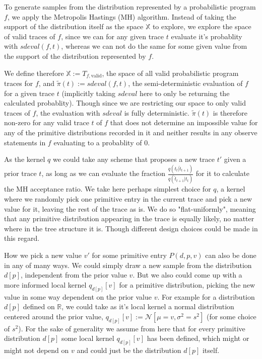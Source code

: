 To generate samples from the distribution represented by a probabilistic program $f$, we apply the Metropolis Hastings (MH) algorithm. Instead of taking the support of the distribution itself as the space $\mathbb{X}$ to explore, we explore the space of valid traces of $f$, since we can for any given trace $t$ evaluate it's probablity with $sdeval(f,t)$, whereas we can not do the same for some given value from the support of the distribution represented by $f$.

We define therefore $\mathbb{X} := T_{f,\text{valid}}$, the space of all valid probabilistic program traces for $f$, and $\tilde{\pi}(t) := sdeval(f,t)$, the semi-deterministic evaluation of $f$ for a given trace $t$ (implicitly taking $sdeval$ here to only be returning the calculated probablity). Though since we are restricting our space to only valid traces of $f$, the evaluation with $sdeval$ is fully deterministic. $\tilde{\pi}(t)$ is therefore non-zero for any valid trace $t$ of $f$ that does not determine an impossible value for any of the primitive distributions recorded in it and neither results in any observe statements in $f$ evaluating to a probablity of $0$.

As the kernel $q$ we could take any scheme that proposes a new trace $t'$ given a prior trace $t$, as long as we can evaluate the fraction $\frac{q(t_t | \hat{t}_{t+1})}{q(\hat{t}_{t+1} | t_t)}$ for it to calculate the MH acceptance ratio. We take here perhaps simplest choice for $q$, a kernel where we randomly pick one primitive entry in the current trace and pick a new value for it, leaving the rest of the trace as is. We do so "flat-uniformly", meaning that any primitive distribution appearing in the trace is equally likely, no matter where in the tree structure it is. Though different design choices could be made in this regard.

How we pick a new value $v'$ for some primitive entry $P(d,p,v)$ can also be done in any of many ways. We could simply draw a new sample from the distribution $d[p]$, independent from the prior value $v$. But we also could come up with a more informed local kernel $q_{d[p]}[v]$ for a primitive distribution, picking the new value in some way dependent on the prior value $v$. For example for a distribution $d[p]$ defined on $\mathbb{R}$, we could take as it's local kernel a normal distribution centered around the prior value, $q_{d[p]}[v] := \mathcal{N}[\mu = v, \sigma^2 = s^2]$ (for some choice of $s^2$). For the sake of generality we assume from here that for every primitive distribution $d[p]$ some local kernel $q_{d[p]}[v]$ has been defined, which might or might not depend on $v$ and could just be the distribution $d[p]$ itself.

